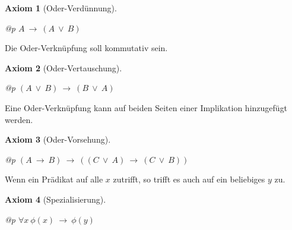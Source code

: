 \documentclass[a4paper,german,10pt,twoside]{book}
\newtheorem{ax}{Axiom}
\theoremstyle{definition}
\theoremstyle{remark}
\begin{document}
\begin{ax}[Oder-Verd{\"u}nnung]
\label{axiom:disjunction_weakening} \hypertarget{axiom:disjunction_weakening}{}
\mbox{}
\begin{longtable}{{@{\extracolsep{\fill}}p{\linewidth}}}
\centering $A\ \rightarrow \ (A\ \lor \ B)$
\end{longtable}

\end{ax}




\par
Die Oder-Verkn{\"u}pfung soll kommutativ sein.

\begin{ax}[Oder-Vertauschung]
\label{axiom:disjunction_commutative} \hypertarget{axiom:disjunction_commutative}{}
\mbox{}
\begin{longtable}{{@{\extracolsep{\fill}}p{\linewidth}}}
\centering $(A\ \lor \ B)\ \rightarrow \ (B\ \lor \ A)$
\end{longtable}

\end{ax}




\par
Eine Oder-Verkn{\"u}pfung kann auf beiden Seiten einer Implikation hinzugef{\"u}gt werden.

\begin{ax}[Oder-Vorsehung]
\label{axiom:disjunction_addition} \hypertarget{axiom:disjunction_addition}{}
\mbox{}
\begin{longtable}{{@{\extracolsep{\fill}}p{\linewidth}}}
\centering $(A\ \rightarrow \ B)\ \rightarrow \ ((C\ \lor \ A)\ \rightarrow \ (C\ \lor \ B))$
\end{longtable}

\end{ax}




\par
Wenn ein Pr{\"a}dikat auf alle $x$ zutrifft, so trifft es auch auf ein beliebiges $y$ zu.

\begin{ax}[Spezialisierung]
\label{axiom:universalInstantiation} \hypertarget{axiom:universalInstantiation}{}
\mbox{}
\begin{longtable}{{@{\extracolsep{\fill}}p{\linewidth}}}
\centering $\forall x\ \phi(x)\ \rightarrow \ \phi(y)$
\end{longtable}

\end{ax}
\end{document}
